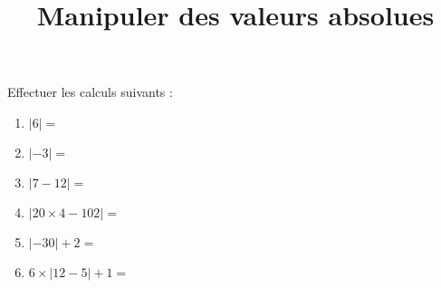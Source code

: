 \documentclass[
	classe=$2^{de}$,
	headerTitle=Chapitre\space 1
]{exercice}
\title{Manipuler des valeurs absolues}
\author{}
\date{}
\begin{document}
\maketitle

\begin{exercice}
	Effectuer les calculs suivants :
	\begin{enumerate}
		\item $|6| = $ 
		\item $|{-}3| = $ 
		\item $|7 - 12| = $ 
		\item $|20 × 4 - 102| = $ 
		\item $|{-}30| + 2 = $ 
		\item $6 × |12 - 5| + 1 = $ 
	\end{enumerate}
\end{exercice}
\end{document}
